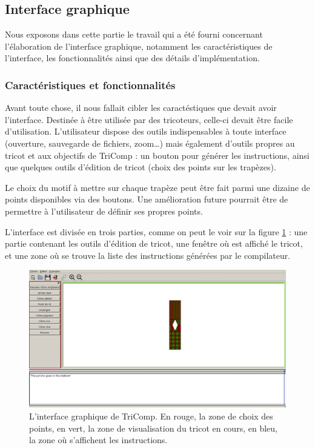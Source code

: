 \documentclass{article}
\begin{document}
\pagebreak


\subsection{Interface graphique}

Nous exposons dans cette partie le travail qui a été fourni concernant
l'élaboration de l'interface graphique, notamment les caractéristiques
de l'interface, les fonctionnalités ainsi que des détails
d'implémentation.

\subsubsection{Caractéristiques et fonctionnalités}

Avant toute chose, il nous fallait cibler les caractéstiques que
devait avoir l'interface. Destinée à être utilisée par des tricoteurs,
celle-ci devait être facile d'utilisation. L'utilisateur dispose des
outils indispensables à toute interface (ouverture, sauvegarde de
fichiers, zoom\dots) mais également d'outils propres au tricot et aux
objectifs de TriComp : un bouton pour générer les instructions, ainsi
que quelques outils d'édition de tricot (choix des points sur les
trapèzes).

Le choix du motif à mettre sur chaque trapèze peut être fait parmi une
dizaine de points disponibles via des boutons. Une amélioration future
pourrait être de permettre à l'utilisateur de définir ses propres points.

L'interface est divisée en trois parties, comme on peut le voir sur la 
figure \ref{interface} : une partie contenant les
outils d'édition de tricot, une fenêtre où est affiché le tricot, et
une zone où se trouve la liste des instructions générées par le
compilateur.

\begin{figure}[!ht]
  \centering \includegraphics[scale=0.35]{../img/interface.jpg}
  \caption{L'interface graphique de TriComp. En \textcolor{rouge}{rouge}, 
    la zone de choix des points, en \textcolor{vert}{vert}, la zone de 
    visualisation du tricot en cours, en \textcolor{bleu}{bleu}, la 
    zone où s'affichent les instructions.}
  \label{interface}
\end{figure}
\end{document}
